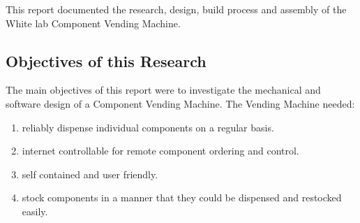\documentclass[a4paper,11pt]{article}
\numberwithin{figure}{section}
\numberwithin{table}{section}
\begin{document}
This report documented the research, design, build process and assembly of the White lab Component Vending Machine. 
	\subsection{Objectives of this Research}
The main objectives of this report were to investigate the mechanical and software design of a Component Vending Machine. The Vending Machine needed:
\begin{enumerate}
\item reliably dispense individual components on a regular basis.
\item internet controllable for remote component ordering and control.
\item self contained and user friendly.
\item stock components in a manner that they could be dispensed and restocked easily.
\end{enumerate}
\end{document}
